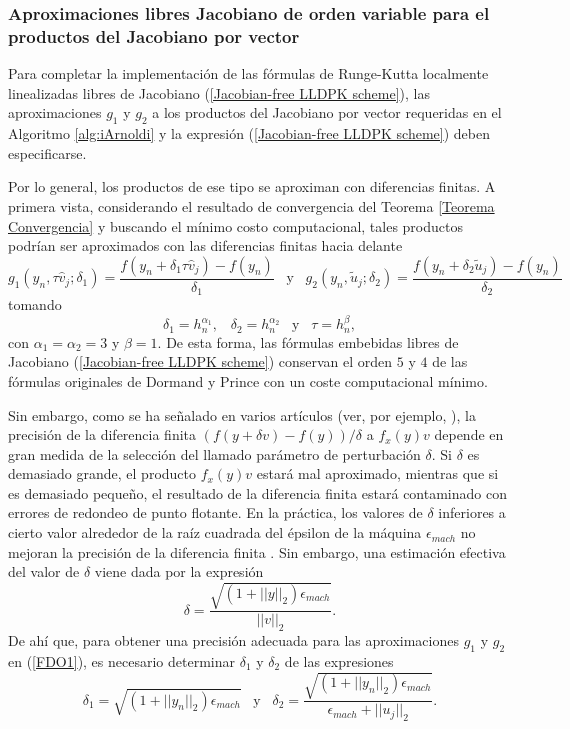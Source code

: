 \subsubsection{Aproximaciones libres Jacobiano de orden variable para el productos del Jacobiano por vector}
Para completar la implementación de las fórmulas de Runge-Kutta localmente linealizadas libres de Jacobiano (\ref{Jacobian-free LLDPK scheme}), las aproximaciones $g_1$ y $g_2$ a los productos del Jacobiano por vector requeridas en el Algoritmo \ref{alg:iArnoldi} y la expresión (\ref{Jacobian-free LLDPK scheme}) deben especificarse.

Por lo general, los productos de ese tipo se aproximan con diferencias finitas. A primera vista, considerando el resultado de convergencia del Teorema \ref{Teorema Convergencia} y buscando el mínimo costo computacional, tales productos podrían ser aproximados con las diferencias finitas hacia delante
\begin{equation}
	g_1(y_n,\tau \widehat{v}_j;\delta_1)=\frac{f(y_n+\delta_1 \tau \widehat{v}_j)-f(y_n)}{\delta_1}  \;\;\; \text{y} \;\;\; g_2(y_n,\widetilde{u}_j;\delta_2)=\frac{f(y_n+\delta_2  \widetilde{u}_j)-f(y_n)}{\delta_2} \label{FDO1}
 \end{equation}
tomando
\begin{equation}\label{deltaconstraint}
	\delta_1 = h_n^{\alpha_1}, \;\;\;  \delta_2 = h_n^{\alpha_2} \;\;\; \text{y} \;\;\; \tau=h_n^{\beta},
\end{equation}
con $\alpha_1=\alpha_2=3$ y $\beta=1$. De esta forma, las fórmulas embebidas libres de Jacobiano (\ref{Jacobian-free LLDPK scheme}) conservan el orden $5$ y $4$ de las fórmulas originales de Dormand y Prince con un coste computacional mínimo.

Sin embargo, como se ha señalado en varios artículos (ver, por ejemplo, \cite{chan1984nonlinearly,knoll2004jacobian}), la precisión de la diferencia finita $(f(y+\delta v)-f(y))/ \delta$ a $f_x(y)v$ depende en gran medida de la selección del llamado parámetro de perturbación $\delta$. Si $\delta$ es demasiado grande, el producto $f_x(y)v$ estará mal aproximado, mientras que si es demasiado pequeño, el resultado de la diferencia finita estará contaminado con errores de redondeo de punto flotante. En la práctica, los valores de $\delta$ inferiores a cierto valor alrededor de la raíz cuadrada del épsilon de la máquina  $\epsilon_{mach}$ no mejoran la precisión de la diferencia finita \cite{knoll2004jacobian}.
Sin embargo, una estimación efectiva del valor de $\delta$ viene dada por la expresión \cite{knoll2004jacobian}
\[ \delta = \frac{\sqrt{(1+||y||_2)\epsilon_{mach}}}{||v||_2}. \]
De ahí que, para obtener una precisión adecuada para las aproximaciones $g_1$ y $g_2$ en (\ref{FDO1}), es necesario determinar $\delta_1$ y $\delta_2$ de las expresiones
\begin{equation} \label{deltavalue}
	\delta_1 = \sqrt{(1+||y_n||_2)\epsilon_{mach}}
	\;\;\; \text{y} \;\;\; \delta_2 = \frac{\sqrt{(1+||y_n||_2)\epsilon_{mach}}}{\epsilon_{mach}+||u_j||_2}.
\end{equation}

